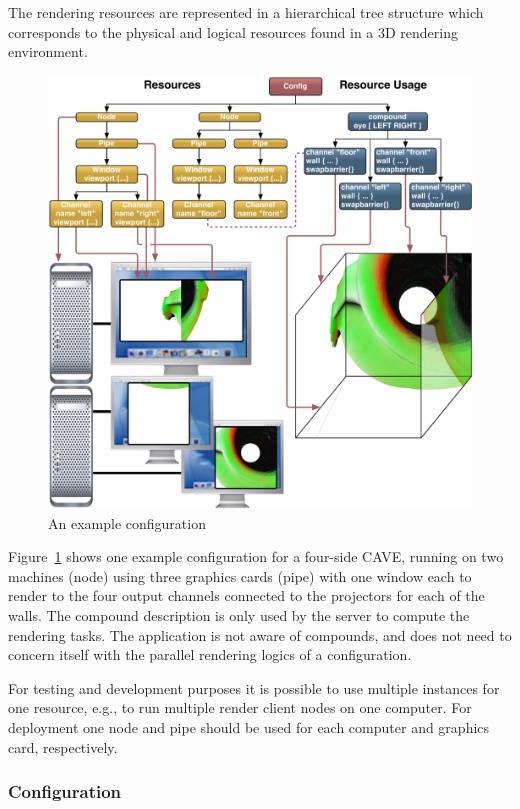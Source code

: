 \documentclass[10pt,a4]{scrartcl}
\newcommand{\fig}[1]{Figure~\ref{#1}}
\begin{document}
The rendering resources are represented in a hierarchical tree structure
which corresponds to the physical and logical resources found in a 3D
rendering environment. 

\begin{figure}[ht!]\center
  \includegraphics[width=.9\textwidth]{images/cave.pdf}
  {\caption{\small\label{fConfig}An example configuration}}
\end{figure}

\fig{fConfig} shows one example configuration for a four-side
CAVE\texttrademark, running on two machines (node) using three graphics
cards (pipe) with one window each to render to the four output channels
connected to the projectors for each of the walls. The compound
description is only used by the server to compute the rendering
tasks. The application is not aware of compounds, and does not need to
concern itself with the parallel rendering logics of a configuration.

For testing and development purposes it is possible to use multiple
instances for one resource, e.g., to run multiple render client nodes on
one computer. For deployment one node and pipe should be used for each
computer and graphics card, respectively.

\subsubsection{Configuration}
\end{document}
